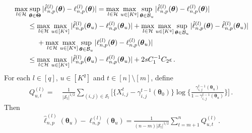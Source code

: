 \documentclass[12pt]{article}
\newcommand{\bTheta}{\boldsymbol \Theta}
\newcommand{\btheta}{\boldsymbol \theta}
\newcommand{\0}{{\bf 0}}
\begin{document}
\begin{align}\label{eq:unicov1}
     &\max_{l\in\mathcal{H}}\sup_{\btheta \in \bTheta}|\hat{\ell}_{n,p}^{(l)}(\btheta) - \ell_{n,p}^{(l)}(\btheta)| =\max_{l\in\mathcal{H}}\max_{u\in[K^q]} \sup_{\btheta \in \mathcal{B}_u} |\hat{\ell}_{n,p}^{(l)}(\btheta) - \ell_{n,p}^{(l)}(\btheta)| \notag
     \\
     &~~~~~~\leq\max_{l\in\mathcal{H}}\max_{u\in[K^q]} |\hat{\ell}_{n,p}^{(l)}(\btheta_u) - \ell_{n,p}^{(l)}(\btheta_u)| +\max_{l\in\mathcal{H}}\max_{u\in[K^q]}\sup_{\btheta\in\mathcal{B}_u}|\hat{\ell}_{n,p}^{(l)}(\btheta) - \hat{\ell}_{n,p}^{(l)}(\btheta_u)|\notag\\
     &~~~~~~~~~~+\max_{l\in\mathcal{H}}\max_{u\in[K^q]}\sup_{\btheta\in\mathcal{B}_u}|{\ell}_{n,p}^{(l)}(\btheta)-{\ell}_{n,p}^{(l)}(\btheta_u)|\\
     &~~~~~~\leq  \max_{l\in\mathcal{H}}\max_{u\in[K^q]} |\hat{\ell}_{n,p}^{(l)}(\btheta_u) - \ell_{n,p}^{(l)}(\btheta_u)| +  2sC_1^{-1}C_2\epsilon\,.\notag
\end{align}
 For each $l\in[q]$, $u\in[K^q]$ and $t\in[n]\setminus[m]$, define
\begin{align*}
Q_{u,t}^{(l)}=&~\frac{1}{|\mathcal{S}_l|^{1/2}}\sum_{(i,j)\in\mathcal{S}_l} \bigg[ \{X_{i,j}^t - \gamma_{i,j}^{t-1}(\btheta_0)\}\log \bigg\{\frac{\gamma_{i,j}^{t-1}(\btheta_u)}{1- \gamma_{i,j}^{t-1}(\btheta_u)}\bigg\}  \bigg]\,.
\end{align*}
Then 
\begin{align}\label{eq:ellexpa}
    \hat{\ell}_{n,p}^{(l)}(\btheta_u) - \ell_{n,p}^{(l)}(\btheta_u) =\frac{1}{(n-m)|\mathcal{S}_l|^{1/2}}\sum_{t = m+1}^n Q_{u,t}^{(l)}\,.
\end{align}
\end{document}

